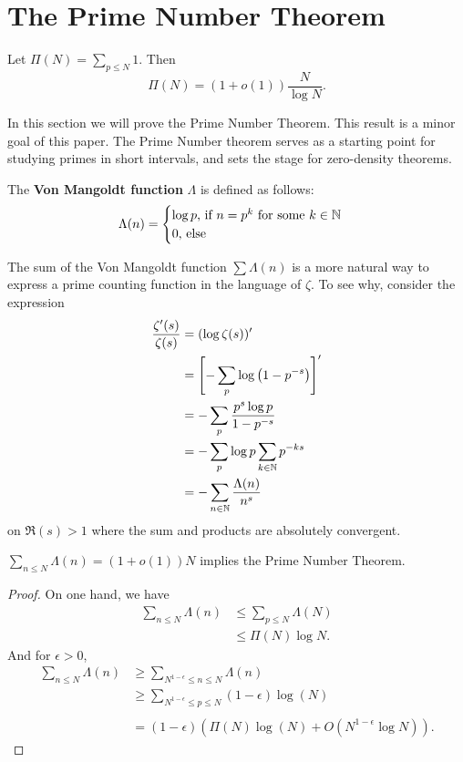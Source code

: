 \section{The Prime Number Theorem}

\begin{theorem}
    Let $\Pi(N)=\sum_{p\leq N} 1$. Then \[
        \Pi(N) = (1+o(1))\frac{N}{\log N}.
    \]
\end{theorem}

In this section we will prove the Prime Number Theorem. This result is a minor goal of this paper.
The Prime Number theorem serves as a starting point for
studying primes in short intervals, and sets the stage for zero-density theorems.
\begin{definition}
    The \textbf{Von Mangoldt function} $\Lambda$ is defined as follows:
    \[
        \Lambda(n) = \begin{cases}
            \log p \textrm{, if $n = p^k$ for some $k\in\mathbb{N}$}\\
            0 \textrm{, else}
        \end{cases}
    \]
\end{definition}
The sum of the Von Mangoldt function $\sum\Lambda (n)$ is a more natural way to express
a prime counting function in the language of $\zeta$. To see why, consider the expression
\begin{align*}
    \frac{\zeta '(s)}{\zeta(s)} &= (\log\zeta(s))'\\
    &= \left[ -\sum_{p} \log\left(1-p^{-s}\right)\right]^{\prime}\\
    &= - \sum_{p} \frac{p^s \log p }{1-p^{-s}}\\
    &= -\sum_{p} \log p \sum_{k\in\mathbb{N}} p^{-ks}\\
    &= - \sum_{n\in\mathbb{N}} \frac{\Lambda(n)}{n^s}
\end{align*}
on $\Re(s)>1$ where the sum and products are absolutely convergent.
\begin{proposition}\label{mangoldtpnt}
    $\sum_{n\leq N} \Lambda(n) = (1+o(1))N$ implies the Prime Number Theorem.
\end{proposition}
\begin{proof}
    On one hand, we have \begin{align*}
        \sum_{n\leq N }\Lambda(n) &\leq \sum_{p \leq N }\Lambda(N)
        \\ &\leq \Pi(N){\log N}.
    \end{align*}
    And for $\epsilon>0$,
    \begin{align*}
        \sum_{n\leq N }\Lambda(n) &\geq \sum_{N^{1-\epsilon}\leq n\leq N }\Lambda(n)
        \\ &\geq \sum_{N^{1-\epsilon}\leq p \leq N }(1-\epsilon) \log(N)\\
        \\&= (1-\epsilon) (\Pi(N)\log(N) + O(N^{1-\epsilon}\log N)).
    \end{align*}
\end{proof}
